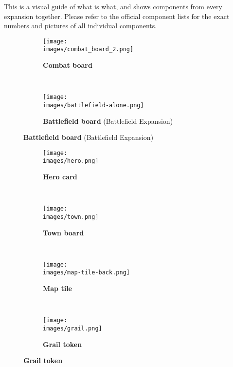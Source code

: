 
This is a visual guide of what is what, and shows components from every expansion together. Please refer to the official component lists for the exact numbers and pictures of all individual components.

\vspace*{-1em}
\begin{figure}[H]
  \centering
  \begin{subfigure}[b]{0.4\linewidth}
    \texttt{[image: \\images/combat\_board\_2.png]}
    \caption{\textbf{Combat board}}
  \end{subfigure}
  ~
  \begin{subfigure}[b]{0.5\linewidth}
    \texttt{[image: \\images/battlefield-alone.png]}
    \caption{\textbf{Battlefield board} (Battlefield Expansion)}
  \end{subfigure}
\end{figure}
\vspace*{-2em}
\begin{figure}[H]
  \centering
  \begin{subfigure}[b]{0.25\linewidth}
    \texttt{[image: \\images/hero.png]}
    \caption{\textbf{Hero card}}
  \end{subfigure}
  ~
  \begin{subfigure}[b]{0.25\linewidth}
    \texttt{[image: \\images/town.png]}
    \caption{\textbf{Town board}}
  \end{subfigure}
  ~
  \begin{subfigure}[b]{0.25\linewidth}
    \centering
    \texttt{[image: \\images/map-tile-back.png]}
    \caption{\textbf{Map tile}}
  \end{subfigure}
  ~
  \begin{subfigure}[b]{0.15\linewidth}
    \centering
    \texttt{[image: \\images/grail.png]}
    \caption{\textbf{Grail token}}
  \end{subfigure}
\end{figure}
\vspace*{-2em}

